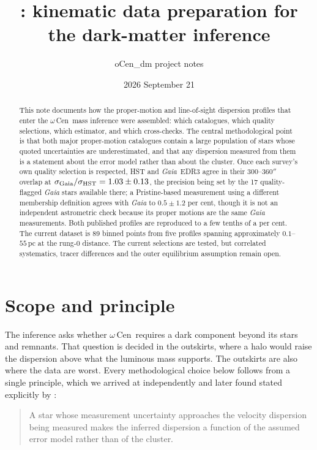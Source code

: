 \documentclass[11pt,a4paper]{article}
\title{\ocen: kinematic data preparation for the dark-matter inference}
\author{oCen\_dm project notes}
\date{2026 September 21}
\newcommand{\ocen}{$\omega$\,Cen}
\begin{document}
\maketitle

\begin{abstract}
This note documents how the proper-motion and line-of-sight dispersion profiles that enter
the \ocen\ mass inference were assembled: which catalogues, which quality selections, which
estimator, and which cross-checks. The central methodological point is that both major
proper-motion catalogues contain a large population of stars whose quoted uncertainties are
underestimated, and that any dispersion measured from them is a statement about the error
model rather than about the cluster. Once each survey's own quality selection is respected,
HST and \emph{Gaia}~EDR3 agree in their $300$--$360''$ overlap at
$\sigma_{\rm Gaia}/\sigma_{\rm HST}=1.03\pm0.13$, the precision being set by the 17
quality-flagged \emph{Gaia} stars available there; a Pristine-based measurement using a
different membership definition agrees with \emph{Gaia} to $0.5\pm1.2$ per cent, though it
is not an independent astrometric check because its proper motions are the same \emph{Gaia}
measurements. Both published profiles are reproduced to a few tenths of a per cent. The
current dataset is 89 binned points from five profiles spanning approximately
$0.1$--$55$\,pc at the rung-0 distance. The current selections are tested, but correlated
systematics, tracer differences and the outer equilibrium assumption remain open.
\end{abstract}

\section{Scope and principle}

The inference asks whether \ocen\ requires a dark component beyond its stars and remnants.
That question is decided in the outskirts, where a halo would raise the dispersion above what
the luminous mass supports. The outskirts are also where the data are worst. Every
methodological choice below follows from a single principle, which we arrived at
independently and later found stated explicitly by \citet{haeberle2025}:

\begin{quote}
A star whose measurement uncertainty approaches the velocity dispersion being measured makes
the inferred dispersion a function of the assumed error model rather than of the cluster.
\end{quote}
\end{document}
